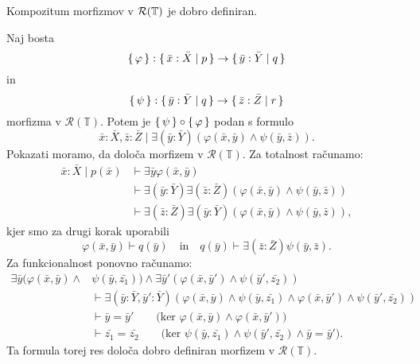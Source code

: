 \documentclass[../kategoricna_logika.tex]{subfiles}
\begin{document}
  \begin{lema}
    Kompozitum morfizmov v $\mathcal{R}(\mathbb{T})$ je dobro definiran.
  \end{lema}
  \begin{dokaz}
    Naj bosta
    $$\lbrace\,\varphi\,\rbrace : \lbrace\,\bar{x}:\bar{X} \mid p\,\rbrace \to \lbrace\,\bar{y}:\bar{Y} \mid q\,\rbrace$$
    in
    $$\lbrace\,\psi\,\rbrace : \lbrace\,\bar{y}:\bar{Y} \mid q\,\rbrace \to \lbrace\,\bar{z}:\bar{Z} \mid r\,\rbrace$$
    morfizma v
    $\mathcal{R}(\mathbb{T})$.  Potem je
    $\lbrace\,\psi\,\rbrace \circ \lbrace\,\varphi\,\rbrace$ podan s formulo
    \[ \bar{x}:\bar{X}, \bar{z}:\bar{Z} \mid
      \exists (\bar{y}:\bar{Y})(\varphi(\bar{x},\bar{y}) \land \psi(\bar{y},\bar{z})). \]
    Pokazati moramo, da določa morfizem v
    $\mathcal{R}(\mathbb{T})$. Za totalnost računamo:
    \begin{align*}
      \bar{x}:\bar{X} \mid p(\bar{x}) &\vdash \exists \bar{y} \varphi(\bar{x},\bar{y}) \\
                                      &\vdash \exists (\bar{y}:\bar{Y}) \exists (\bar{z}:\bar{Z})
                                        (\varphi(\bar{x},\bar{y}) \land \psi(\bar{y},\bar{z})) \\
                    &\vdash \exists (\bar{z}:\bar{Z}) \exists (\bar{y}:\bar{Y}) (\varphi(\bar{x},\bar{y}) \land \psi(\bar{y},\bar{z})),
    \end{align*}
    kjer smo za drugi korak uporabili
    \[ \varphi(\bar{x},\bar{y}) \vdash q(\bar{y})
      \quad \text{in}\quad q(\bar{y}) \vdash \exists (\bar{z}:\bar{Z}) \psi(\bar{y},\bar{z}).\]
    Za funkcionalnost ponovno računamo:
    \begin{align*}
      \exists\bar{y}(\varphi(\bar{x},\bar{y}) \land& \psi(\bar{y},\bar{z_{1}})) \land \exists\bar{y}' (\varphi(\bar{x},\bar{y}') \land \psi(\bar{y}',\bar{z_{2}})) \\
                        &\vdash \exists (\bar{y}:\bar{Y},\bar{y}':\bar{Y}) (\varphi(\bar{x},\bar{y}) \land \psi(\bar{y},\bar{z_{1}}) \land \varphi(\bar{x},\bar{y}') \land \psi(\bar{y}',\bar{z_{2}})) \\
                        &\vdash \bar{y} = \bar{y}' \qquad \text{(ker $\varphi(\bar{x},\bar{y}) \land \varphi(\bar{x},\bar{y}')$)} \\
                        &\vdash \bar{z_{1}} = \bar{z_{2}} \qquad \text{(ker $\psi(\bar{y},\bar{z_{1}}) \land \psi(\bar{y}',\bar{z_{2}}) \land \bar{y}=\bar{y}'$)}.
    \end{align*}
    Ta formula torej res določa dobro definiran morfizem v
    $\mathcal{R}(\mathbb{T})$.
  \end{dokaz}
\end{document}

